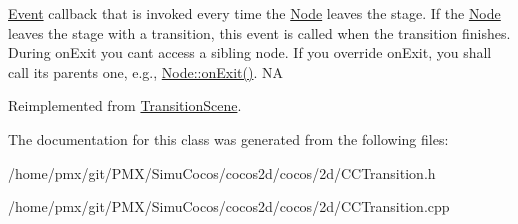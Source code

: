 \hyperlink{classEvent}{Event} callback that is invoked every time the \hyperlink{classNode}{Node} leaves the \textquotesingle{}stage\textquotesingle{}. If the \hyperlink{classNode}{Node} leaves the \textquotesingle{}stage\textquotesingle{} with a transition, this event is called when the transition finishes. During on\+Exit you can\textquotesingle{}t access a sibling node. If you override on\+Exit, you shall call its parent\textquotesingle{}s one, e.\+g., \hyperlink{classNode_ac83de835ea315e3179d4293acd8903ac}{Node\+::on\+Exit()}.  NA 

Reimplemented from \hyperlink{classTransitionScene_a45e39b658189c79428a05c3bc3173bbb}{Transition\+Scene}.



The documentation for this class was generated from the following files\+:\begin{DoxyCompactItemize}
\item 
/home/pmx/git/\+P\+M\+X/\+Simu\+Cocos/cocos2d/cocos/2d/C\+C\+Transition.\+h\item 
/home/pmx/git/\+P\+M\+X/\+Simu\+Cocos/cocos2d/cocos/2d/C\+C\+Transition.\+cpp\end{DoxyCompactItemize}

